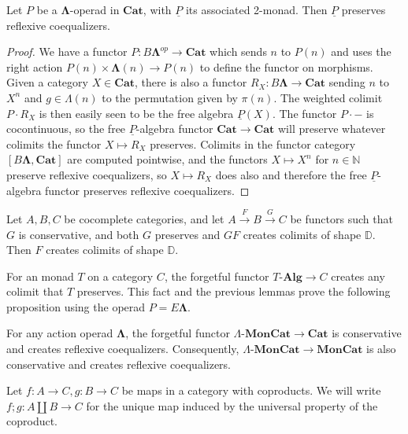 \documentclass{amsbook} %
\newcommand{\mb}{\mathbf}
\newcommand{\und}[1]{\ensuremath{\underline{#1}}}
\newcommand{\ML}{\mathbf{\Lambda}}
\newcommand{\lmc}{\Lambda\mbox{-}\mb{MonCat}}
\newcommand{\moncat}{\ensuremath{\mb{MonCat}}}
\newcommand{\cat}{\ensuremath{\mb{Cat}}}
\newcommand{\Alg}{\mbox{-}\mb{Alg}}
\numberwithin{section}{chapter}
\begin{document}
\begin{lem}\label{P_pres_refl}
Let $P$ be a $\ML$-operad in $\cat$, with $\und{P}$ its associated 2-monad. Then $\und{P}$ preserves reflexive coequalizers.

\end{lem}
\begin{proof}
We have a functor $P \colon B\ML^{op} \rightarrow \cat$ which sends $n$ to $P(n)$ and uses the right action $P(n) \times \ML(n) \rightarrow P(n)$ to define the functor on morphisms. Given a category $X \in \cat$, there is also a functor $R_X \colon B\ML \rightarrow \cat$ sending $n$ to $X^n$ and $g \in \Lambda(n)$ to the permutation given by $\pi(n)$. The weighted colimit $P \cdot R_X$ is then easily seen to be the free algebra $\und{P}(X)$. The functor $P \cdot -$ is cocontinuous, so the free $\und{P}$-algebra functor $\cat \rightarrow \cat$ will preserve whatever colimits the functor $X \mapsto R_X$ preserves. Colimits in the functor category $[B\ML, \cat]$ are computed pointwise, and the functors $X \mapsto X^n$ for $n \in \mathbb{N}$ preserve reflexive coequalizers, so $X \mapsto R_X$ does also and therefore the free $\und{P}$-algebra functor preserves reflexive coequalizers.
\end{proof}

\begin{lem}\label{creation_triangle}
Let $A,B,C$ be cocomplete categories, and let $A \stackrel{F}{\to} B \stackrel{G}{\to} C$ be functors such that $G$ is conservative, and both $G$ preserves and $GF$ creates colimits of shape $\mathbb{D}$. Then $F$ creates colimits of shape $\mathbb{D}$.
\end{lem}

For an monad $T$ on a category $C$, the forgetful functor $T\Alg \rightarrow C$ creates any colimit that $T$ preserves. This fact and the previous lemmas prove the following proposition using the operad $P = E\ML$.
\begin{prop}\label{refcoeq_calcs}
For any action operad $\ML$, the forgetful functor $\lmc \rightarrow \cat$ is conservative and creates reflexive coequalizers. Consequently, $\lmc \rightarrow \moncat$ is also conservative and creates reflexive coequalizers.

\end{prop}

\begin{nota}\label{plus_notation}
Let $f \colon  A \rightarrow C, g \colon  B \rightarrow C$ be maps in a category with coproducts. We will write $f;g \colon  A \coprod B \rightarrow C$ for the unique map induced by the universal property of the coproduct.
\end{nota}
\end{document}
